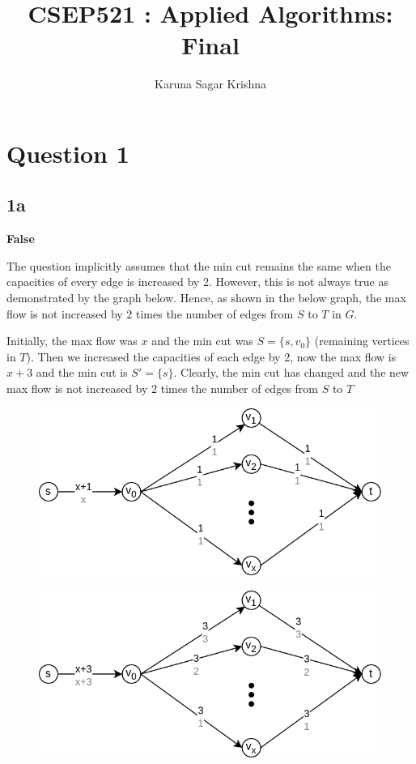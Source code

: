 \documentclass{article}
\title{CSEP521 : Applied Algorithms: Final}
\author{Karuna Sagar Krishna}
\begin{document}
    \maketitle

    \section*{Question 1}

    \subsection*{1a}
    \textbf{False}

    The question implicitly assumes that the min cut remains the same when the capacities of every edge is increased by 2. However, this is not always true as demonstrated by the graph below. Hence, as shown in the below graph, the max flow is not increased by 2 times the number of edges from $S$ to $T$ in $G$.

    Initially, the max flow was $x$ and the min cut was $S = \{s, v_0\}$ (remaining vertices in $T$). Then we increased the capacities of each edge by 2, now the max flow is $x+3$ and the min cut is $S' = \{s\}$. Clearly, the min cut has changed and the new max flow is not increased by 2 times the number of edges from $S$ to $T$

    \begin{figure}[H]
        \includegraphics[width=1\textwidth]{maxflowIncreasedCapacity1.png}
    \end{figure}

    \begin{figure}[H]
        \includegraphics[width=1\textwidth]{maxflowIncreasedCapacity2.png}
    \end{figure}
\end{document}
